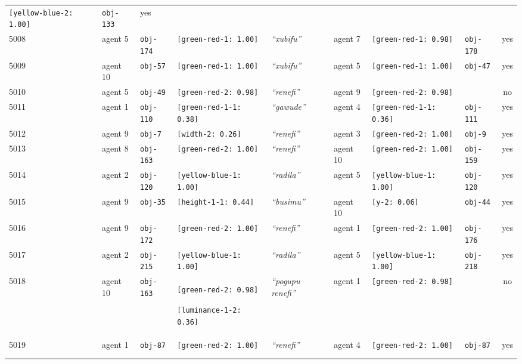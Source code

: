 {\begin{tabular}{lllp{2.8cm}llp{2.8cm}lc}
\texttt{[yellow-blue-2: 1.00]} & \texttt{obj-133} & yes \\
5008 & agent 5 & \texttt{obj-174} & \texttt{[green-red-1: 1.00]} & \textit{``xubifu''} & agent 7 & \texttt{[green-red-1: 0.98]} & \texttt{obj-178} & yes \\
5009 & agent 10 & \texttt{obj-57} & \texttt{[green-red-1: 1.00]} & \textit{``xubifu''} & agent 5 & \texttt{[green-red-1: 1.00]} & \texttt{obj-47} & yes \\
5010 & agent 5 & \texttt{obj-49} & \texttt{[green-red-2: 0.98]} & \textit{``renefi''} & agent 9 & \texttt{[green-red-2: 0.98]} & \texttt{} & no \\
5011 & agent 1 & \texttt{obj-110} & \texttt{[green-red-1-1: 0.38]} & \textit{``gawude''} & agent 4 & \texttt{[green-red-1-1: 0.36]} & \texttt{obj-111} & yes \\
5012 & agent 9 & \texttt{obj-7} & \texttt{[width-2: 0.26]} & \textit{``renefi''} & agent 3 & \texttt{[green-red-2: 1.00]} & \texttt{obj-9} & yes \\
5013 & agent 8 & \texttt{obj-163} & \texttt{[green-red-2: 1.00]} & \textit{``renefi''} & agent 10 & \texttt{[green-red-2: 1.00]} & \texttt{obj-159} & yes \\
5014 & agent 2 & \texttt{obj-120} & \texttt{[yellow-blue-1: 1.00]} & \textit{``radila''} & agent 5 & \texttt{[yellow-blue-1: 1.00]} & \texttt{obj-120} & yes \\
5015 & agent 9 & \texttt{obj-35} & \texttt{[height-1-1: 0.44]} & \textit{``busimu''} & agent 10 & \texttt{[y-2: 0.06]} & \texttt{obj-44} & yes \\
5016 & agent 9 & \texttt{obj-172} & \texttt{[green-red-2: 1.00]} & \textit{``renefi''} & agent 1 & \texttt{[green-red-2: 1.00]} & \texttt{obj-176} & yes \\
5017 & agent 2 & \texttt{obj-215} & \texttt{[yellow-blue-1: 1.00]} & \textit{``radila''} & agent 5 & \texttt{[yellow-blue-1: 1.00]} & \texttt{obj-218} & yes \\
5018 & agent 10 & \texttt{obj-163} & \texttt{[green-red-2: 0.98]}

\texttt{[luminance-1-2: 0.36]} & \textit{``pogupu renefi''} & agent 1 & \texttt{[green-red-2: 0.98]} & \texttt{} & no \\
5019 & agent 1 & \texttt{obj-87} & \texttt{[green-red-2: 1.00]} & \textit{``renefi''} & agent 4 & \texttt{[green-red-2: 1.00]} & \texttt{obj-87} & yes \\
\\[1.0em]
 \\\end{tabular}}




